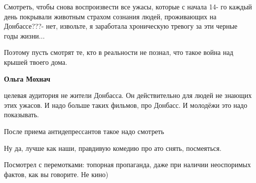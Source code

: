 \begin{itemize}

Смотреть, чтобы снова воспроизвести все ужасы, которые с начала 14- го каждый
день покрывали животным страхом сознания людей, проживающих на Донбассе???-
нет, извольте, я заработала хроническую тревогу за эти черные годы жизни...

Поэтому пусть смотрят те, кто в реальности не познал, что такое война над
крышей твоего дома.

\begin{itemize}
 
\textbf{Ольга Мохнач} 

целевая аудитория не жители Донбасса. Он действительно
для людей не знающих этих ужасов. И надо больше таких фильмов, про Донбасс. И
молодёжи это надо показывать.
\end{itemize}

 
После приема антидепрессантов такое надо смотреть

 
Ну да, лучше как наши, правдивую комедию про ато снять, посмеяться.

 
Посмотрел с перемотками: топорная пропаганда, даже при наличии неоспоримых фактов, как вы говорите. Не кино)

\begin{itemize}
 

\end{itemize}
\end{itemize}
